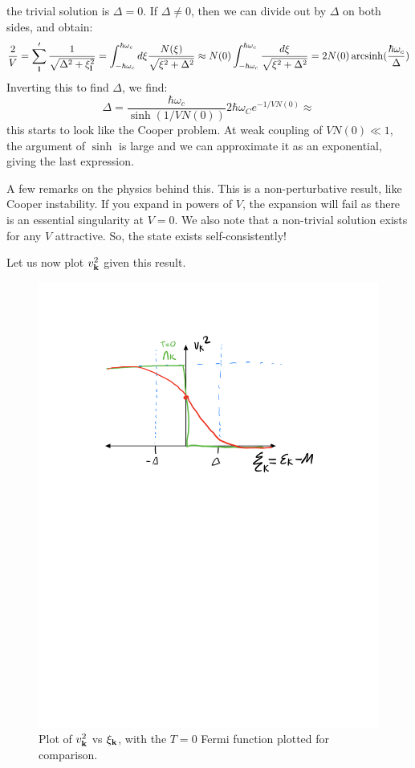 the trivial solution is $\Delta = 0$. If $\Delta \neq 0$, then we can divide out by $\Delta$ on both sides, and obtain:
\begin{align*}
    \frac{2}{V} = \sum_{\mathbf{l}}' \frac{1}{\sqrt{\Delta^2 + \xi_{\mathbf{l}}^2}} = \int_{-\hbar\omega_c}^{\hbar\omega_c} d\xi \frac{N(\xi)}{\sqrt{\xi^2 + \Delta^2}} \approx N(0)\int_{-\hbar\omega_c}^{\hbar\omega_c} \frac{d\xi}{\sqrt{\xi^2 + \Delta^2}} = 2N(0)\operatorname{arcsinh}(\frac{\hbar\omega_c}{\Delta})
\end{align*}
Inverting this to find $\Delta$, we find:
\begin{equation}
    \Delta = \frac{\hbar\omega_c}{\sinh(1/VN(0))} 2\hbar \omega_C e^{-1/VN(0)}\approx 
\end{equation}
this starts to look like the Cooper problem. At weak coupling of $VN(0) \ll 1$, the argument of $\sinh$ is large and we can approximate it as an exponential, giving the last expression.

A few remarks on the physics behind this. This is a non-perturbative result, like Cooper instability. If you expand in powers of $V$, the expansion will fail as there is an essential singularity at $V = 0$. We also note that a non-trivial solution exists for any $V$ attractive. So, the state exists self-consistently!

Let us now plot $v_{\mathbf{k}}^2$ given this result.

\begin{figure}[htbp]
    \centering
    \includegraphics[scale=0.7]{Images/fig-vksquareplotbcs.pdf}
    \caption{Plot of $v_{\mathbf{k}}^2$ vs $\xi_{\mathbf{k}}$, with the $T = 0$ Fermi function plotted for comparison.}
    \label{fig-vksquareplotbcs}
\end{figure}


